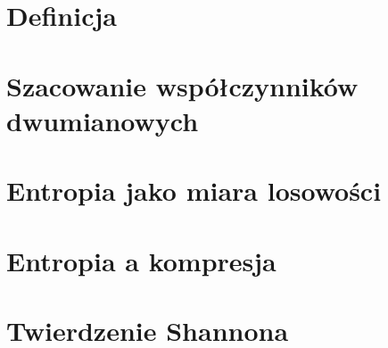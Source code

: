 \section{Definicja}


\newpage
\section{Szacowanie współczynników dwumianowych}


\newpage
\section{Entropia jako miara losowości}


\newpage
\section{Entropia a kompresja}


\newpage
\section{Twierdzenie Shannona}
